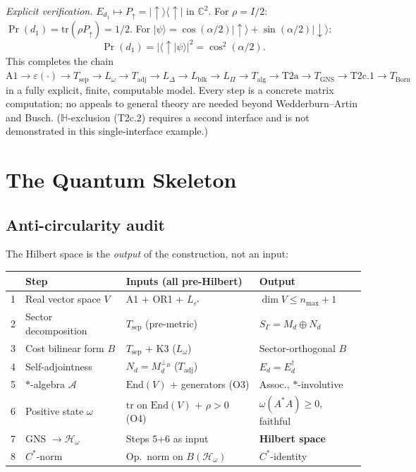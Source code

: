 \documentclass[11pt,a4paper]{article}
\theoremstyle{definition}
\newcommand{\eps}{\varepsilon}
\newcommand{\End}{\mathrm{End}}
\newcommand{\tr}{\mathrm{tr}}
\begin{document}
\smallskip\noindent\textit{Explicit verification.}  $E_{d_1} \mapsto P_\uparrow = |{\uparrow}\rangle\langle{\uparrow}|$ in $\mathbb{C}^2$.  For $\rho = I/2$: $\Pr(d_1) = \tr(\rho P_\uparrow) = 1/2$.  For $|\psi\rangle = \cos(\alpha/2)|{\uparrow}\rangle + \sin(\alpha/2)|{\downarrow}\rangle$:
\[
\Pr(d_1) = |\langle{\uparrow}|\psi\rangle|^2 = \cos^2(\alpha/2).
\]
This completes the chain $\mathrm{A1} \to \eps(\cdot) \to T_{\mathrm{sep}} \to L_\omega \to T_{\mathrm{adj}} \to L_\Delta \to L_{\mathrm{blk}} \to L_\Pi \to T_{\mathrm{alg}} \to \mathrm{T2a} \to T_{\mathrm{GNS}} \to \mathrm{T2c.1} \to T_{\mathrm{Born}}$ in a fully explicit, finite, computable model.  Every step is a concrete matrix computation; no appeals to general theory are needed beyond Wedderburn--Artin and Busch.  ($\mathbb{H}$-exclusion (T2c.2) requires a second interface and is not demonstrated in this single-interface example.)

\section{The Quantum Skeleton}
\label{sec:skeleton}

\subsection{Anti-circularity audit}

The Hilbert space is the \emph{output} of the construction, not an input:

\smallskip
\begin{center}\small
\begin{tabular}{@{}clll@{}}
\toprule
& \textbf{Step} & \textbf{Inputs (all pre-Hilbert)} & \textbf{Output} \\
\midrule
1 & Real vector space $V$ & A1 + OR1 + $L_{\eps^*}$ & $\dim V \le n_{\max}+1$ \\
2 & Sector decomposition & $T_{\mathrm{sep}}$ (pre-metric) & $S_\Gamma = M_d \oplus N_d$ \\
3 & Cost bilinear form $B$ & $T_{\mathrm{sep}}$ + K3 ($L_\omega$) & Sector-orthogonal $B$ \\
4 & Self-adjointness & $N_d = M_d^{\perp_B}$ ($T_{\mathrm{adj}}$) & $E_d = E_d^\dagger$ \\
5 & $*$-algebra $\mathcal{A}$ & $\End(V)$ + generators (O3) & Assoc., $*$-involutive \\
6 & Positive state $\omega$ & $\tr$ on $\End(V)$ + $\rho > 0$ (O4) & $\omega(A^*A) \ge 0$, faithful \\
7 & GNS $\to \mathcal{H}_\omega$ & Steps 5+6 as input & \textbf{Hilbert space} \\
8 & $C^*$-norm & Op.\ norm on $B(\mathcal{H}_\omega)$ & $C^*$-identity \\
\bottomrule
\end{tabular}
\end{center}
\end{document}
